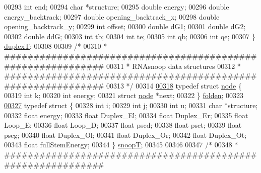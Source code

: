 \begin{DoxyCode}
00293   \textcolor{keywordtype}{int} end;
00294   \textcolor{keywordtype}{char} *structure;
00295   \textcolor{keywordtype}{double} energy;
00296   \textcolor{keywordtype}{double} energy\_backtrack;
00297   \textcolor{keywordtype}{double} opening\_backtrack\_x;
00298   \textcolor{keywordtype}{double} opening\_backtrack\_y;
00299   \textcolor{keywordtype}{int} offset;
00300   \textcolor{keywordtype}{double} dG1;
00301   \textcolor{keywordtype}{double} dG2;
00302   \textcolor{keywordtype}{double} ddG;
00303   \textcolor{keywordtype}{int} tb;
00304   \textcolor{keywordtype}{int} te;
00305   \textcolor{keywordtype}{int} qb;
00306   \textcolor{keywordtype}{int} qe;
00307 \} \hyperlink{group__data__structures_structduplexT}{duplexT};
00308 
00309 \textcolor{comment}{/*}
00310 \textcolor{comment}{* ############################################################}
00311 \textcolor{comment}{* RNAsnoop data structures}
00312 \textcolor{comment}{* ############################################################}
00313 \textcolor{comment}{*/}
00314 
\hypertarget{data__structures_8h_source.tex_l00318}{}\hyperlink{group__data__structures}{00318} \textcolor{keyword}{typedef} \textcolor{keyword}{struct }\hyperlink{group__data__structures_structnode}{node} \{
00319   \textcolor{keywordtype}{int} k;
00320   \textcolor{keywordtype}{int} energy;
00321   \textcolor{keyword}{struct }\hyperlink{group__data__structures_structnode}{node} *next;
00322 \} \hyperlink{group__data__structures_gaaf402058651c8218fa72788d591cda05}{folden};
00323 
\hypertarget{data__structures_8h_source.tex_l00327}{}\hyperlink{group__data__structures}{00327} \textcolor{keyword}{typedef} \textcolor{keyword}{struct }\{
00328   \textcolor{keywordtype}{int} i;
00329   \textcolor{keywordtype}{int} j;
00330   \textcolor{keywordtype}{int} u;
00331   \textcolor{keywordtype}{char} *structure;
00332   \textcolor{keywordtype}{float} energy;
00333   \textcolor{keywordtype}{float} Duplex\_El;
00334   \textcolor{keywordtype}{float} Duplex\_Er;
00335   \textcolor{keywordtype}{float} Loop\_E;
00336   \textcolor{keywordtype}{float} Loop\_D;
00337   \textcolor{keywordtype}{float} pscd;
00338   \textcolor{keywordtype}{float} psct;
00339   \textcolor{keywordtype}{float} pscg;
00340   \textcolor{keywordtype}{float} Duplex\_Ol;
00341   \textcolor{keywordtype}{float} Duplex\_Or;
00342   \textcolor{keywordtype}{float} Duplex\_Ot;
00343   \textcolor{keywordtype}{float} fullStemEnergy;
00344 \} \hyperlink{group__data__structures_structsnoopT}{snoopT};
00345 
00346 
00347 \textcolor{comment}{/*}
00348 \textcolor{comment}{* ############################################################}

\end{DoxyCode}
